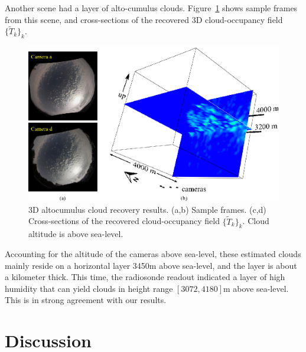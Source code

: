\documentclass[runningheads]{llncs}
\begin{document}
Another scene had a layer of alto-cumulus clouds. Figure~\ref{fig:alto} shows sample frames from this scene, and cross-sections of the recovered 3D cloud-occupancy field $\{\tilde T_k\}_k$.
\begin{figure}[t!]
\begin{center}
   \includegraphics[width=1\linewidth]{figures/altos.eps}
\end{center}
   \vspace{-0.6cm}
   \caption{3D altocumulus cloud recovery results. (a,b) Sample frames.  
   (c,d)  Cross-sections of the recovered cloud-occupancy field $\{\tilde T_k\}_k$. Cloud
   altitude is above sea-level.}
\label{fig:alto}
\end{figure}
Accounting for the altitude of the cameras above sea-level, these estimated clouds mainly reside on a horizontal layer 3450m above sea-level, and the layer is about a kilometer thick. This time, the radiosonde readout indicated a layer of high humidity that can yield clouds in height range $[3072,4180]$m above sea-level. This is in strong agreement with our results.





%


\section{Discussion}
\label{sec:discuss}
\end{document}
